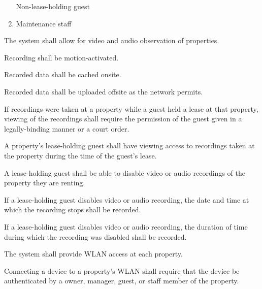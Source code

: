 \documentclass[letter,titlepage,oneside,english]{report}
\begin{document}
\begin{fr}
\begin{fr}
\begin{enumerate}
      Non-lease-holding guest
    \item
      Maintenance staff
    \end{enumerate}
  \end{fr}
\item
  The system shall allow for video and audio observation of properties.
  \begin{fr}
  \item
    Recording shall be motion-activated.
  \item
    Recorded data shall be cached onsite.
  \item
    Recorded data shall be uploaded offsite as the network permits.
  \item
    If recordings were taken at a property while a guest held a lease at that property, viewing of the recordings shall require the permission of the guest given in a legally-binding manner or a court order.
  \item
    A property's lease-holding guest shall have viewing access to recordings taken at the property during the time of the guest's lease.
  \item
    A lease-holding guest shall be able to disable video or audio recordings of the property they are renting.
    \begin{fr}
    \item
      If a lease-holding guest disables video or audio recording, the date and time at which the recording stops shall be recorded.
    \item
      If a lease-holding guest disables video or audio recording, the duration of time during which the recording was disabled shall be recorded.
    \end{fr}
  \end{fr}
\item
  The system shall provide WLAN access at each property.
  \begin{fr}
  \item
    Connecting a device to a property's WLAN shall require that the device be authenticated by a owner, manager, guest, or staff member of the property.
  \end{fr}
\end{fr}
\end{document}
